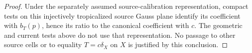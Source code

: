 \begin{proof}
Under the separately assumed source-calibration
representation, compact tests on this injectively
tropicalized source Gauss plane identify its coefficient
with \(b_T(p)\), hence its ratio to the canonical
coefficient with \(c\). The geometric and current tests
above do not use that representation.
No passage to other source cells or to equality
\(T=c\delta_X\) on \(X\) is justified by this conclusion.
\end{proof}

